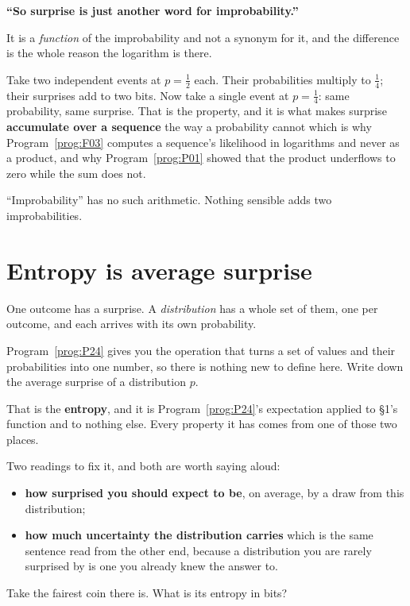 \begin{fr}
\begin{trapbox}
\textbf{\enquote{So surprise is just another word for improbability.}}

It is a \emph{function} of the improbability and not a synonym for it, and the
difference is the whole reason the logarithm is there.

Take two independent events at $p = \frac{1}{2}$ each. Their probabilities
multiply to $\frac{1}{4}$; their surprises add to two bits. Now take a single
event at $p = \frac{1}{4}$: same probability, same surprise. That is the
property, and it is what makes surprise \textbf{accumulate over a sequence}
the way a probability cannot \dash{} which is why
Program~\ref{prog:F03} computes a sequence's likelihood in logarithms and
never as a product, and why Program~\ref{prog:P01} showed that the product
underflows to zero while the sum does not.

\enquote{Improbability} has no such arithmetic. Nothing sensible adds two
improbabilities.
\end{trapbox}
\end{fr}

\section{Entropy is average surprise}
\label{sec:P29-entropy}

\begin{fr}
One outcome has a surprise. A \emph{distribution} has a whole set of them, one
per outcome, and each arrives with its own probability.

Program~\ref{prog:P24} gives you the operation that turns a set of values and
their probabilities into one number, so there is nothing new to define here.
Write down the average surprise of a distribution $p$.
\dotline
\nextframe
\end{fr}

\begin{fr}

That is the \textbf{entropy}, and it is Program~\ref{prog:P24}'s expectation
applied to §1's function and to nothing else. Every property it has comes from
one of those two places.

Two readings to fix it, and both are worth saying aloud:

\begin{itemize}
\item \textbf{how surprised you should expect to be}, on average, by a draw
  from this distribution;
\item \textbf{how much uncertainty the distribution carries} \dash{} which is
  the same sentence read from the other end, because a distribution you are
  rarely surprised by is one you already knew the answer to.
\end{itemize}

Take the fairest coin there is. What is its entropy in bits?
\dotline
\nextframe
\end{fr}

